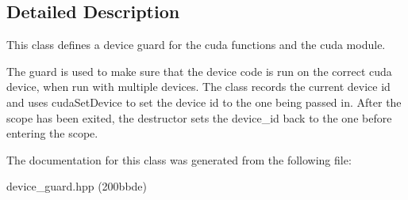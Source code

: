 \subsection{Detailed Description}
This class defines a device guard for the cuda functions and the cuda module. 

The guard is used to make sure that the device code is run on the correct cuda device, when run with multiple devices. The class records the current device id and uses {\ttfamily cuda\+Set\+Device} to set the device id to the one being passed in. After the scope has been exited, the destructor sets the device\+\_\+id back to the one before entering the scope. 

The documentation for this class was generated from the following file\+:\begin{DoxyCompactItemize}
\item 
device\+\_\+guard.\+hpp (200bbde)\end{DoxyCompactItemize}
